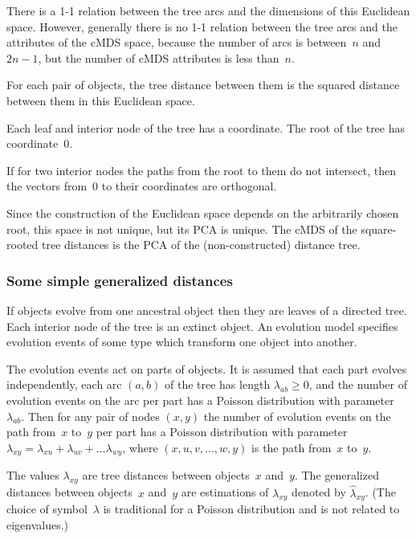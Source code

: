\documentclass[10pt,a4paper]{article}
\begin{document}
There is a 1-1 relation between the tree arcs and the dimensions of this Euclidean space. 
However, generally there is no 1-1 relation between the tree arcs and the attributes of the cMDS space, 
because the number of arcs is between~$n$ and $2n-1$, but the number of cMDS attributes is less than~$n$.

For each pair of objects, the tree distance between them is the squared distance between them in this Euclidean space. 

Each leaf and interior node of the tree has a coordinate. 
The root of the tree has coordinate~0. 

If for two interior nodes the paths from the root to them do not intersect, then the vectors from~0 to their coordinates are orthogonal. 

Since the construction of the Euclidean space depends on the arbitrarily chosen root, this space is not unique, 
but its PCA is unique.
The cMDS of the square-rooted tree distances is the PCA of the (non-constructed) distance tree.



\subsubsection {Some simple generalized distances}


If objects evolve from one ancestral object then they are leaves of a directed tree. 
Each interior node of the tree is an extinct object. 
An evolution model specifies evolution events of some type which transform one object into another. 

The evolution events act on parts of objects. 
It is assumed that each part evolves independently, each arc $(a,b)$ of the tree has length $\lambda_{ab} \ge 0$, 
and the number of evolution events on the arc per part has a Poisson distribution with parameter $\lambda_{ab}$. 
Then for any pair of nodes $(x,y)$ the number of evolution events on the path from~$x$ to~$y$ per part has a Poisson distribution with parameter 
$\lambda_{xy} = \lambda_{xu} + \lambda_{uv} + \dots \lambda_{wy}$, 
where $(x, u, v, \dots, w, y)$ is the path from~$x$ to~$y$. 

The values $\lambda_{xy}$ are tree distances between objects~$x$ and~$y$. 
The generalized distances between objects~$x$ and~$y$ are estimations of $\lambda_{xy}$
denoted by $\hat \lambda_{xy}$.
(The choice of symbol~$\lambda$ is traditional for a Poisson distribution and is not related to eigenvalues.)
\end{document}
